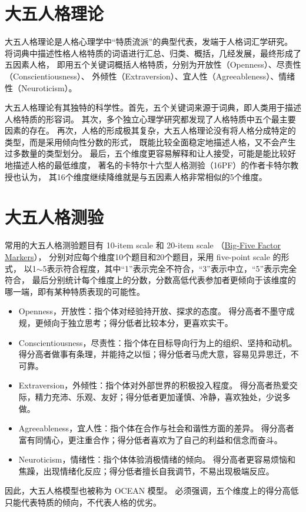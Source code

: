 \documentclass[UTF8]{ctexart}
\begin{document}
    \section{大五人格理论}
      大五人格理论是人格心理学中“特质流派”的典型代表，发端于人格词汇学研究。
      将词典中描述性格人格特质的词语进行汇总、归类、概括，几经发展，最终形成了五因素人格，
      即用五个关键词概括人格特质，分别为开放性（Openness）、尽责性（Conscientiousness）、
      外倾性（Extraversion）、宜人性（Agreeableness）、情绪性（Neuroticism）。\par
      大五人格理论有其独特的科学性。首先，五个关键词来源于词典，即人类用于描述人格特质的形容词。
      其次，多个独立心理学研究都发现了人格特质中五个最主要因素的存在。
      再次，人格的形成极其复杂，大五人格理论没有将人格分成特定的类型，而是采用倾向性分数的形式，
      既能比较全面稳定地描述人格，又不会产生过多数量的类型划分。
      最后，五个维度更容易解释和让人接受，可能是能比较好地描述人格的最低维度，
      著名的卡特尔十六型人格测验（16PF）的作者卡特尔教授也认为，
      其16个维度继续降维就是与五因素人格非常相似的5个维度。
    \section{大五人格测验}
      常用的大五人格测验题目有 10-item scale 和 20-item scale
      （\href{https://ipip.ori.org/newBigFive5broadKey.htm}{Big-Five Factor Markers}），
      分别对应每个维度10个题目和20个题目，采用 five-point scale 的形式，
      以1$\sim$5表示符合程度，其中“1”表示完全不符合，“3”表示中立，“5”表示完全符合，
      最后分别统计每个维度上的分数，分数高低代表参加者更倾向于该维度的哪一端，即有某种特质表现的可能性。
      \begin{itemize}
        \item Openness，开放性：指个体对经验持开放、探求的态度。
        得分高者不墨守成规，更倾向于独立思考；得分低者比较本分，更喜欢实干。
        \item Conscientiousness，尽责性：指个体在目标导向行为上的组织、坚持和动机。
        得分高者做事有条理，并能持之以恒；得分低者马虎大意，容易见异思迁，不可靠。
        \item Extraversion，外倾性：指个体对外部世界的积极投入程度。
        得分高者热爱交际，精力充沛、乐观、友好；得分低者更加谨慎、冷静，喜欢独处，少说多做。
        \item Agreeableness，宜人性：指个体在合作与社会和谐性方面的差异。
        得分高者富有同情心，更注重合作；得分低者喜欢为了自己的利益和信念而奋斗。
        \item Neuroticism，情绪性：指个体体验消极情绪的倾向。
        得分高者更容易烦恼和焦躁，出现情绪化反应；得分低者擅长自我调节，不易出现极端反应。
      \end{itemize}
      \par
      因此，大五人格模型也被称为 OCEAN 模型。
      必须强调，五个维度上的得分高低只能代表特质的倾向，不代表人格的优劣。
\end{document}
